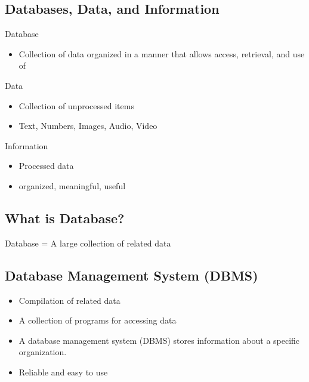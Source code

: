 \documentclass[a4paper, 12pt]{article}
\begin{document}
    \subsection{Databases, Data, and Information}
        Database
        \begin{itemize}
            \item Collection of data organized in a manner that allows access, retrieval, and use of
        \end{itemize}

        Data
        \begin{itemize}
            \item Collection of unprocessed items
            \item Text, Numbers, Images, Audio, Video
        \end{itemize}

        Information
        \begin{itemize}
            \item Processed data
            \item organized, meaningful, useful
        \end{itemize}

    \subsection{What is Database?}
    Database = A large collection of related
    data
    \subsection{Database Management System (DBMS)}
    \begin{itemize}
        \item Compilation of related data
        \item A collection of programs for accessing data
        \item A database management system (DBMS) stores information about a specific
        organization.
        \item Reliable and easy to use
    \end{itemize}
\end{document}
